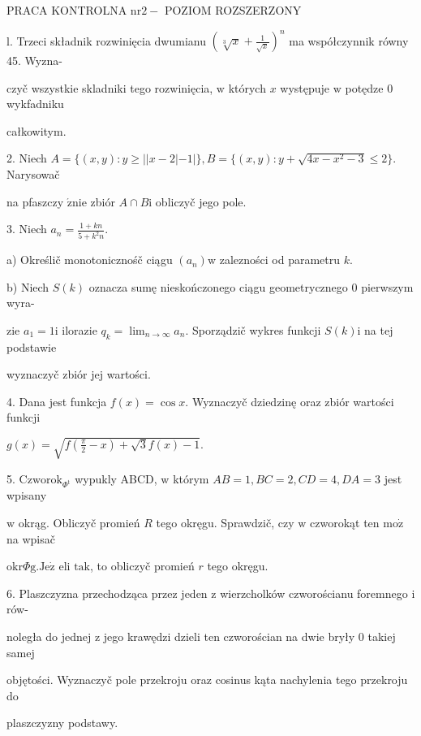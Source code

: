 \documentclass[a4paper,12pt]{article}
\begin{document}
PRACA KONTROLNA $\mathrm{n}\mathrm{r}2-$ POZIOM ROZSZERZONY

l. Trzeci składnik rozwinięcia dwumianu $(\displaystyle \sqrt[3]{x}+\frac{1}{\sqrt{x}})^{n}$ ma współczynnik równy 45. Wyzna-

czyč wszystkie skladniki tego rozwinięcia, $\mathrm{w}$ których $x$ występuje $\mathrm{w}$ potędze $0$ wykfadniku

całkowitym.

2. Niech $A=\{(x,y):y\geq||x-2|-1|\}, B=\{(x,y):y+\sqrt{4x-x^{2}-3}\leq 2\}$. Narysowač

na pfaszczy $\acute{\mathrm{z}}\mathrm{n}\mathrm{i}\mathrm{e}$ zbiór $A\cap B\mathrm{i}$ obliczyč jego pole.

3. Niech $a_{n}=\displaystyle \frac{1+kn}{5+k^{2}n}.$

a) Określič monotonicznośč ciągu $(a_{n})\mathrm{w}$ zalezności od parametru $k.$

b) Niech $S(k)$ oznacza sumę nieskończonego ciągu geometrycznego $0$ pierwszym wyra-

zie $a_{1}=1 \mathrm{i}$ ilorazie $q_{k}=\displaystyle \lim_{n\rightarrow\infty}a_{n}$. Sporządzič wykres funkcji $S(k)\mathrm{i}$ na tej podstawie

wyznaczyč zbiór jej wartości.

4. Dana jest funkcja $f(x)=\cos x$. Wyznaczyč dziedzinę oraz zbiór wartości funkcji

$g(x)=\sqrt{f(\frac{\pi}{2}-x)+\sqrt{3}f(x)-1}.$

5. $\mathrm{C}\mathrm{z}\mathrm{w}\mathrm{o}\mathrm{r}\mathrm{o}\mathrm{k}_{\Phi^{\mathrm{t}}}$ wypukly ABCD, $\mathrm{w}$ którym $AB=1, BC=2, CD=4, DA=3$ jest wpisany

$\mathrm{w}$ okrąg. Obliczyč promień $R$ tego okręgu. Sprawdzič, czy $\mathrm{w}$ czworokąt ten $\mathrm{m}\mathrm{o}\dot{\mathrm{z}}$ na wpisač

$\mathrm{o}\mathrm{k}\mathrm{r}\Phi \mathrm{g}. \mathrm{J}\mathrm{e}\dot{\mathrm{z}}$ eli $\mathrm{t}\mathrm{a}\mathrm{k}$, to obliczyč promień $r$ tego okręgu.

6. Plaszczyzna przechodząca przez jeden $\mathrm{z}$ wierzcholków czworościanu foremnego $\mathrm{i}$ rów-

noległa do jednej $\mathrm{z}$ jego krawędzi dzieli ten czworościan na dwie bryły $0$ takiej samej

objętości. Wyznaczyč pole przekroju oraz cosinus kąta nachylenia tego przekroju do

plaszczyzny podstawy.
\end{document}
